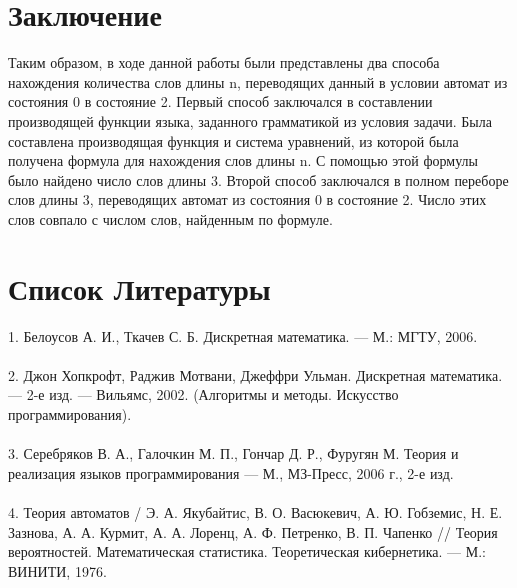 \documentclass[a4paper,12pt]{article} %
\begin{document}
		\section{Заключение}
		Таким образом, в ходе данной работы были представлены два способа нахождения количества слов длины n, переводящих данный в условии автомат из состояния 0 в состояние 2.
		Первый способ заключался в составлении производящей функции языка, заданного грамматикой из условия задачи. Была составлена производящая функция и система уравнений, из которой была получена формула для нахождения слов длины n. С помощью этой формулы было найдено число слов длины 3. Второй способ заключался в полном переборе слов длины 3, переводящих автомат из состояния 0 в состояние 2. Число этих слов совпало с числом слов, найденным по формуле. 
		\newpage
		\section{Список Литературы}
		1.	Белоусов А. И., Ткачев С. Б. Дискретная математика. — М.: МГТУ, 2006.\\ \\
		2.	Джон Хопкрофт, Раджив Мотвани, Джеффри Ульман. Дискретная математика. — 2-е изд. — Вильямс, 2002. (Алгоритмы и методы. Искусство программирования).\\ \\
		3.	Серебряков В. А., Галочкин М. П., Гончар Д. Р., Фуругян М. Теория и реализация языков программирования  — М., МЗ-Пресс, 2006 г., 2-е изд.\\ \\
		4.	Теория автоматов / Э. А. Якубайтис, В. О. Васюкевич, А. Ю. Гобземис, Н. Е. Зазнова, А. А. Курмит, А. А. Лоренц, А. Ф. Петренко, В. П. Чапенко // Теория вероятностей. Математическая статистика. Теоретическая кибернетика. — М.: ВИНИТИ, 1976.
		
		
\end{document}
